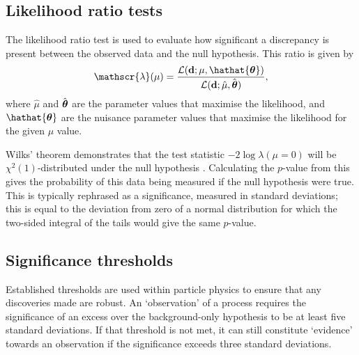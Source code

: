 \subsection{Likelihood ratio tests}
\label{sec:methods-stats-llhr}

The likelihood ratio test is used to evaluate how significant a discrepancy is
present between the observed data and the null hypothesis. This ratio is given
by
\begin{equation*}
  \mathscr{\lambda}(\mu) = \frac{ \mathcal{L}( \dvec ; \mu, \hathat{\thetavec} ) }
                                { \mathcal{L}( \dvec ; \hat{\mu}, \hat{\thetavec} ) },
\end{equation*}
where $\hat{\mu}$ and $\hat{\boldsymbol{\theta}}$ are the parameter values that maximise
the likelihood, and $\hathat{\thetavec}$ are the nuisance parameter values that
maximise the likelihood for the given $\mu$ value.

Wilks' theorem demonstrates that the test statistic $-2\log\lambda(\mu=0)$ will
be $\chi^2(1)$-distributed under the null hypothesis \cite{Wilks1938}.
Calculating the $p$-value from this gives the probability of this data being
measured if the null hypothesis were true. This is typically rephrased as a
significance, measured in standard deviations; this is equal to the deviation
from zero of a normal distribution for which the two-sided integral of the tails
would give the same $p$-value.


\subsection{Significance thresholds}
\label{sec:methods-stats-signifthresh}

Established thresholds are used within particle physics to ensure that any
discoveries made are robust. An `observation' of a process requires
the significance of an excess over the background-only hypothesis to be at least
five standard deviations. If that threshold is not met, it can still constitute
`evidence' towards an observation if the significance exceeds three standard
deviations.
